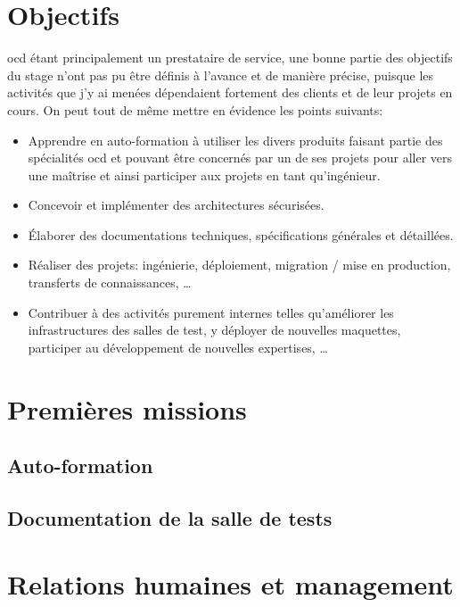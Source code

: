 \documentclass[12pt, oneside, a4paper, titlepage]{report}
\begin{document}
\section{Objectifs}%
\label{sec:mission::objectifs}

\acrlong{ocd} étant principalement un prestataire de service, une bonne partie
des objectifs du stage n'ont pas pu être définis à l'avance et de manière
précise, puisque les activités que j'y ai menées dépendaient fortement des
clients et de leur projets en cours. On peut tout de même mettre en évidence les
points suivants:

\begin{itemize}
    \item Apprendre en auto-formation à utiliser les divers produits faisant
        partie des spécialités \gls{ocd} et pouvant être concernés par un de ses
        projets pour aller vers une maîtrise et ainsi participer aux projets en
        tant qu'ingénieur.
    \item Concevoir et implémenter des architectures sécurisées.
    \item Élaborer des documentations techniques, spécifications générales et
        détaillées.
    \item Réaliser des projets: ingénierie, déploiement, migration / mise en
        production, transferts de connaissances, \ldots
    \item Contribuer à des activités purement internes telles qu'améliorer les
        infrastructures des salles de test, y déployer de nouvelles maquettes,
        participer au développement de nouvelles expertises, \ldots
\end{itemize}

\section{Premières missions}%
\label{sec:mission::prems}

\subsection{Auto-formation}%
\label{sub:mission::prems::auto-formation}

\subsection{Documentation de la salle de tests}%
\label{sub:mission::prems::doc-salle-tests}

\section{Relations humaines et management}%
\label{sec:mission::rhm}
\end{document}
